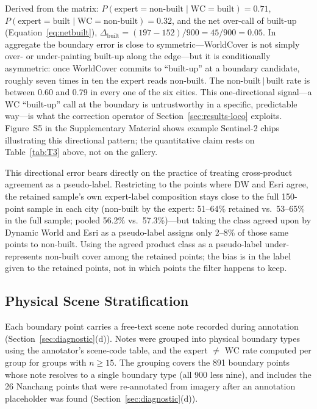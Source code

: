\documentclass[remotesensing,article,submit,moreauthors]{Definitions/mdpi}
\begin{document}
Derived from the matrix: $P(\text{expert} = \text{non-built} \mid \text{WC} =
\text{built}) = 0.71$, $P(\text{expert} = \text{built} \mid \text{WC} =
\text{non-built}) = 0.32$, and the net over-call of built-up
(Equation~\eqref{eq:netbuilt}), $\Delta_{\text{built}} = (197 - 152)/900 =
45/900 = 0.05$. In aggregate the boundary error is close to
symmetric---WorldCover is not simply over- or under-painting built-up along the
edge---but it is conditionally asymmetric: once WorldCover commits to
``built-up'' at a boundary candidate, roughly seven times in ten the expert
reads non-built. The non-built\,$\mid$\,built rate is between 0.60 and 0.79 in
every one of the six cities. This one-directional signal---a WC ``built-up''
call at the boundary is untrustworthy in a specific, predictable way---is what
the correction operator of Section~\ref{sec:results-loco} exploits. Figure~S5
in the Supplementary Material shows example Sentinel-2 chips illustrating this
directional pattern; the quantitative claim rests on Table~\ref{tab:T3} above,
not on the gallery.

This directional error bears directly on the practice of treating
cross-product agreement as a pseudo-label. Restricting to the points where DW
and Esri agree, the retained sample's own expert-label composition
stays close to the full 150-point sample in each city (non-built by the
expert: 51--64\% retained vs.\ 53--65\% in the full sample; pooled 56.2\% vs.\
57.3\%)---but taking the class agreed upon by Dynamic World and Esri as a
pseudo-label assigns only 2--8\% of those same points to non-built. Using the
agreed product class as a pseudo-label under-represents non-built cover among
the retained points; the bias is in the label given to the retained points,
not in which points the filter happens to keep.

\subsection{Physical Scene Stratification}\label{sec:results-scene}

Each boundary point carries a free-text scene note recorded during annotation
(Section~\ref{sec:diagnostic}(d)). Notes were grouped into physical boundary
types using the annotator's scene-code table, and the expert $\neq$ WC rate
computed per group for groups with $n \ge 15$. The grouping covers the 891
boundary points whose note resolves to a single boundary type (all 900 less
nine), and includes the 26 Nanchang points that were re-annotated from imagery
after an annotation placeholder was found (Section~\ref{sec:diagnostic}(d)).
\end{document}
